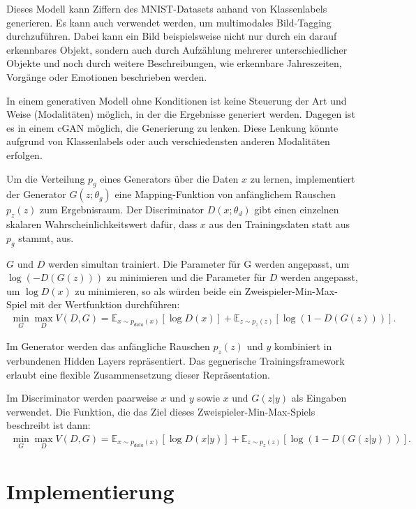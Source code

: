 Dieses Modell kann Ziffern des MNIST-Datasets anhand von Klassenlabels generieren. Es kann auch verwendet werden, um multimodales Bild-Tagging durchzuführen. Dabei kann ein Bild beispielsweise nicht nur durch ein darauf erkennbares Objekt, sondern auch durch Aufzählung mehrerer unterschiedlicher Objekte und noch durch weitere Beschreibungen, wie erkennbare Jahreszeiten, Vorgänge oder Emotionen beschrieben werden.

In einem generativen Modell ohne Konditionen ist keine Steuerung der Art und Weise (Modalitäten) möglich, in der die Ergebnisse generiert werden. Dagegen ist es in einem cGAN möglich, die Generierung zu lenken. Diese Lenkung könnte aufgrund von Klassenlabels oder auch verschiedensten anderen Modalitäten erfolgen.

Um die Verteilung $p_g$ eines Generators über die Daten $x$ zu lernen, implementiert der Generator $G(z;\theta_g)$ eine Mapping-Funktion von anfänglichem Rauschen $p_z(z)$ zum Ergebnisraum. Der Discriminator $D(x;\theta_d)$ gibt einen einzelnen skalaren Wahrscheinlichkeitswert dafür, dass $x$ aus den Trainingsdaten statt aus $p_g$ stammt, aus.

$G$ und $D$ werden simultan trainiert. Die Parameter für G werden angepasst, um $\log(-D(G(z)))$ zu minimieren und die Parameter für $D$ werden angepasst, um $\log D(x)$ zu minimieren, so als würden beide ein Zweispieler-Min-Max-Spiel mit der Wertfunktion durchführen:
\begin{align}
\min_{G}\max_{D} V(D,G) = \mathbb{E}_{x\sim p_{data}(x)}[\log{D(x)}]+\mathbb{E}_{z\sim p_z(z)}[\log(1-D(G(z)))].
\end{align}

Im Generator werden das anfängliche Rauschen $p_z(z)$ und $y$ kombiniert in verbundenen Hidden Layers repräsentiert. Das gegnerische Trainingsframework erlaubt eine flexible Zusammensetzung dieser Repräsentation.

Im Discriminator werden paarweise $x$ und $y$ sowie $x$ und $G(z|y)$ als Eingaben verwendet. Die Funktion, die das Ziel dieses Zweispieler-Min-Max-Spiels beschreibt ist dann:
\begin{align}
\min_{G}\max_{D} V(D,G) = \mathbb{E}_{x\sim p_{data}(x)}[\log{D(x|y)}]+\mathbb{E}_{z\sim p_z(z)}[\log(1-D(G(z|y)))].
\end{align}

\chapter{Implementierung}

